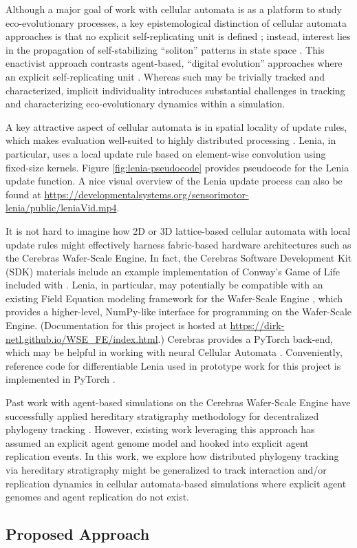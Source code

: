 Although a major goal of work with cellular automata is as a platform to study eco-evolutionary processes, a key epistemological distinction of cellular automata approaches is that no explicit self-replicating unit is defined \citep{hamon2022learning}; instead, interest lies in the propagation of self-stabilizing ``soliton'' patterns in state space \citep{chan2019lenia}.
This enactivist approach contrasts agent-based, ``digital evolution'' approaches where an explicit self-replicating unit \citep{pennock2007models}.
Whereas such may be trivially tracked and characterized, implicit individuality introduces substantial challenges in tracking and characterizing eco-evolutionary dynamics within a simulation.

A key attractive aspect of cellular automata is in spatial locality of update rules, which makes evaluation well-suited to highly distributed processing \citep{ackley2023robust}.
Lenia, in particular, uses a local update rule based on element-wise convolution using fixed-size kernels.
Figure \ref{fig:lenia-pseudocode} provides pseudocode for the Lenia update function.
A nice visual overview of the Lenia update process can also be found at \url{https://developmentalsystems.org/sensorimotor-lenia/public/leniaVid.mp4}.

It is not hard to imagine how 2D or 3D lattice-based cellular automata with local update rules might effectively harness fabric-based hardware architectures such as the Cerebras Wafer-Scale Engine.
In fact, the Cerebras Software Development Kit (SDK) materials include an example implementation of Conway's Game of Life included with \citep{cerebras2024gol}.
Lenia, in particular, may potentially be compatible with an existing Field Equation modeling framework for the Wafer-Scale Engine \citep{woo2022disruptive}, which provides a higher-level, NumPy-like interface for programming on the Wafer-Scale Engine.
(Documentation for this project is hosted at \url{https://dirk-netl.github.io/WSE_FE/index.html}.)
Cerebras provides a PyTorch back-end, which may be helpful in working with neural Cellular Automata \citep{cerebras2022pytorch}.
Conveniently, reference code for differentiable Lenia used in prototype work for this project is implemented in PyTorch \citep{hamon2022learning}.

Past work with agent-based simulations on the Cerebras Wafer-Scale Engine have successfully applied hereditary stratigraphy methodology for decentralized phylogeny tracking \citep{moreno2024trackable}.
However, existing work leveraging this approach has assumed an explicit agent genome model and hooked into explicit agent replication events.
In this work, we explore how distributed phylogeny tracking via hereditary stratigraphy might be generalized to track interaction and/or replication dynamics in cellular automata-based simulations where explicit agent genomes and agent replication do not exist.

\subsection{Proposed Approach}



